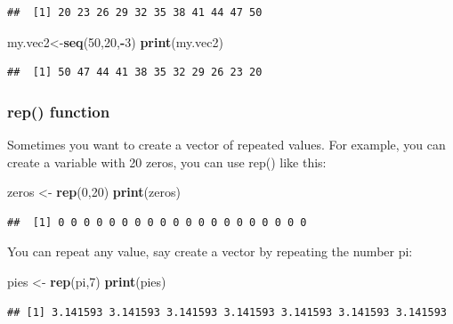 \documentclass[
]{book}
\newenvironment{Shaded}{\begin{snugshade}}{\end{snugshade}}
\newcommand{\DecValTok}[1]{\textcolor[rgb]{0.00,0.00,0.81}{#1}}
\newcommand{\KeywordTok}[1]{\textcolor[rgb]{0.13,0.29,0.53}{\textbf{#1}}}
\newcommand{\NormalTok}[1]{#1}
\newcommand{\OperatorTok}[1]{\textcolor[rgb]{0.81,0.36,0.00}{\textbf{#1}}}
\newcommand{\StringTok}[1]{\textcolor[rgb]{0.31,0.60,0.02}{#1}}
\theoremstyle{definition}
\theoremstyle{definition}
\theoremstyle{definition}
\theoremstyle{remark}
\begin{document}
\begin{verbatim}
##  [1] 20 23 26 29 32 35 38 41 44 47 50
\end{verbatim}

\begin{Shaded}
\begin{Highlighting}[]
\NormalTok{my.vec2\textless{}{-}}\KeywordTok{seq}\NormalTok{(}\DecValTok{50}\NormalTok{,}\DecValTok{20}\NormalTok{,}\OperatorTok{{-}}\DecValTok{3}\NormalTok{)}
\KeywordTok{print}\NormalTok{(my.vec2)}
\end{Highlighting}
\end{Shaded}

\begin{verbatim}
##  [1] 50 47 44 41 38 35 32 29 26 23 20
\end{verbatim}

\hypertarget{rep-function}{%
\subsubsection{rep() function}\label{rep-function}}

Sometimes you want to create a vector of repeated values. For example, you can create a variable with 20 zeros, you can use rep() like this:

\begin{Shaded}
\begin{Highlighting}[]
\NormalTok{zeros \textless{}{-}}\StringTok{ }\KeywordTok{rep}\NormalTok{(}\DecValTok{0}\NormalTok{,}\DecValTok{20}\NormalTok{)}
\KeywordTok{print}\NormalTok{(zeros)}
\end{Highlighting}
\end{Shaded}

\begin{verbatim}
##  [1] 0 0 0 0 0 0 0 0 0 0 0 0 0 0 0 0 0 0 0 0
\end{verbatim}

You can repeat any value, say create a vector by repeating the number pi:

\begin{Shaded}
\begin{Highlighting}[]
\NormalTok{pies \textless{}{-}}\StringTok{ }\KeywordTok{rep}\NormalTok{(pi,}\DecValTok{7}\NormalTok{)}
\KeywordTok{print}\NormalTok{(pies)}
\end{Highlighting}
\end{Shaded}

\begin{verbatim}
## [1] 3.141593 3.141593 3.141593 3.141593 3.141593 3.141593 3.141593
\end{verbatim}
\end{document}
